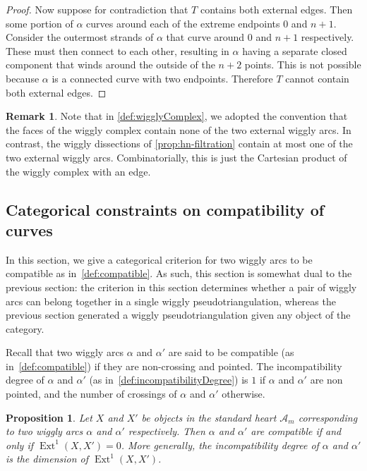 \documentclass{amsart}
\newtheorem{proposition}[theorem]{Proposition}
\theoremstyle{definition}
\newtheorem{remark}[theorem]{Remark}
\DeclareMathOperator{\Ext}{Ext} %
\begin{document}
\begin{proof}
  Now suppose for contradiction that \(T\) contains both external edges.
  Then some portion of \(\alpha\) curves around each of the extreme endpoints \(0\) and \(n+1\).
  Consider the outermost strands of \(\alpha\) that curve around \(0\) and \(n+1\) respectively.
  These must then connect to each other, resulting in \(\alpha\) having a separate closed component that winds around the outside of the \(n+2\) points.
  This is not possible because \(\alpha\) is a connected curve with two endpoints.
  Therefore \(T\) cannot contain both external edges.
\end{proof}

\begin{remark}
Note that in \cref{def:wigglyComplex}, we adopted the convention that the faces of the wiggly complex contain none of the two external wiggly arcs.
In contrast, the wiggly dissections of \cref{prop:hn-filtration} contain at most one of the two external wiggly arcs.
Combinatorially, this is just the Cartesian product of the wiggly complex with an edge.
\end{remark}


\subsection{Categorical constraints on compatibility of curves}
\label{subsec:categoricalCompatibility}

In this section, we give a categorical criterion for two wiggly arcs to be compatible as in~\cref{def:compatible}.
As such, this section is somewhat dual to the previous section: the criterion in this section determines whether a pair of wiggly arcs can belong together in a single wiggly pseudotriangulation, whereas the previous section generated a wiggly pseudotriangulation given any object of the category.

Recall that two wiggly arcs \(\alpha\) and \(\alpha'\) are said to be compatible (as in~\cref{def:compatible}) if they are non-crossing and pointed.
The incompatibility degree of \(\alpha\) and \(\alpha'\) (as in~\cref{def:incompatibilityDegree}) is \(1\) if \(\alpha\) and \(\alpha'\) are non pointed, and the number of crossings of \(\alpha\) and \(\alpha'\) otherwise.
\begin{proposition}
\label{prop:ext1}
Let \(X\) and \(X'\) be objects in the standard heart \(\mathcal{A}_m\) corresponding to two wiggly arcs \(\alpha\) and \(\alpha'\) respectively.
  Then \(\alpha\) and \(\alpha'\) are compatible if and only if \(\Ext^1(X, X') = 0\).
  More generally, the incompatibility degree of \(\alpha\) and \(\alpha'\) is the dimension of \(\Ext^1(X,X')\).
\end{proposition}
\end{document}
